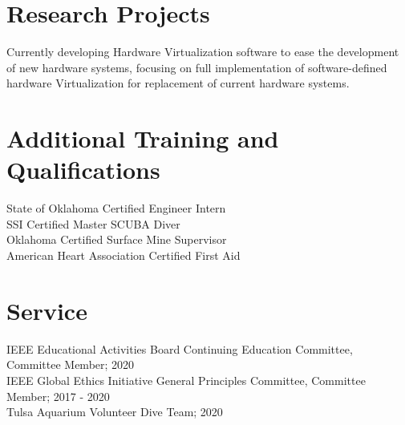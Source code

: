\documentclass{hutch_resume}
\begin{document}
\section{Research Projects}
Currently developing Hardware Virtualization software to ease the development of new hardware systems, focusing on full implementation of software-defined hardware Virtualization for replacement of current hardware systems.
\section{Additional Training and Qualifications}
State of Oklahoma Certified Engineer Intern\\
SSI Certified Master SCUBA Diver\\
Oklahoma Certified Surface Mine Supervisor\\
American Heart Association Certified First Aid
\section{Service}
IEEE Educational Activities Board Continuing Education Committee, Committee Member; 2020\\
IEEE Global Ethics Initiative General Principles Committee, Committee Member; 2017 - 2020\\
Tulsa Aquarium Volunteer Dive Team; 2020
\end{document}
